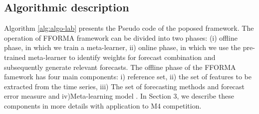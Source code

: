 \documentclass[11pt,a4paper,]{article}
\theoremstyle{definition}
\theoremstyle{definition}
\theoremstyle{definition}
\theoremstyle{remark}
\begin{document}
\subsection{Algorithmic description}\label{algorithmic-description}

Algorithm \ref{alg:algo-lab} presents the Pseudo code of the poposed
framework. The operation of FFORMA framework can be divided into two
phases: (i) offline phase, in which we train a meta-learner, ii) online
phase, in which we use the pre-trained meta-learner to identify weights
for forecast combination and subsequently generate relevant forecasts.
The offline phase of the FFORMA famework has four main components: i)
reference set, ii) the set of features to be extracted from the time
series, iii) The set of forecasting methods and forecast error measure
and iv)Meta-learning model . In Section 3, we describe these components
in more details with application to M4 competition.
\end{document}
